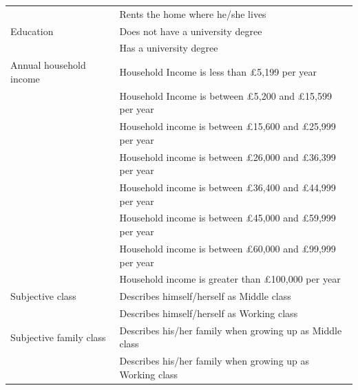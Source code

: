 \documentclass[]{cupjournal}
\begin{document}
\begin{table}
\begin{tabular}[t]{ll}
 & Rents the home where he/she lives\\
\addlinespace
Education & Does not have a university degree\\
 & Has a university degree\\
Annual household income & Household Income is less than £5,199 per year\\
 & Household Income is between £5,200 and £15,599 per year\\
 & Household income is between £15,600 and £25,999 per year\\
\addlinespace
 & Household income is between £26,000 and £36,399 per year\\
 & Household income is between £36,400 and £44,999 per year\\
 & Household income is between £45,000 and £59,999 per year\\
 & Household income is between £60,000 and £99,999 per year\\
 & Household income is greater than £100,000 per year\\
\addlinespace
Subjective class & Describes himself/herself as Middle class\\
 & Describes himself/herself as Working class\\
Subjective family class & Describes his/her family when growing up as Middle class\\
 & Describes his/her family when growing up as Working class\\
\bottomrule
\end{tabular}
\end{table}

\newpage
\end{document}
